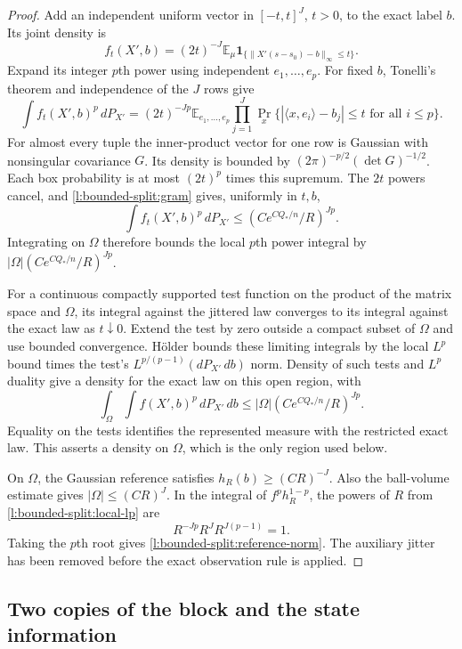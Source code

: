 \begin{proof}
Add an independent uniform vector in \([-t,t]^J\), \(t>0\), to
the exact label \(b\).  Its joint density is
\[
 f_t(X',b)=(2t)^{-J}\mathbb E_\mu
   \mathbf1_{\{\|X'(s-s_0)-b\|_\infty\le t\}}.
\]
Expand its integer \(p\)th power using independent
\(e_1,\ldots,e_p\).  For fixed \(b\), Tonelli's theorem and
independence of the \(J\) rows give
\[
 \int f_t(X',b)^p\,dP_{X'}
 =(2t)^{-Jp}\mathbb E_{e_1,\ldots,e_p}
 \prod_{j=1}^J
 \Pr_x\{|\langle x,e_i\rangle-b_j|\le t\text{ for all }i\le p\}.
\]
For almost every tuple the inner-product vector for one row is
Gaussian with nonsingular covariance \(G\).  Its density is bounded
by \((2\pi)^{-p/2}(\det G)^{-1/2}\).  Each box probability is
at most \((2t)^p\) times this supremum.  The \(2t\) powers cancel,
and \eqref{l:bounded-split:gram} gives, uniformly in \(t,b\),
\[
 \int f_t(X',b)^p\,dP_{X'}
 \le(Ce^{CQ_*/n}/R)^{Jp}.
\]
Integrating on \(\Omega\) therefore bounds the local \(p\)th
power integral by
\(|\Omega|(Ce^{CQ_*/n}/R)^{Jp}\).

For a continuous compactly supported test function on the product
of the matrix space and \(\Omega\), its integral against the
jittered law converges to its integral against the exact law as
\(t\downarrow0\).  Extend the test by zero outside a compact
subset of \(\Omega\) and use bounded convergence.
H\"older bounds these limiting integrals by the local \(L^p\)
bound times the test's \(L^{p/(p-1)}(dP_{X'}\,db)\) norm.
Density of such tests and \(L^p\) duality give a density for the
exact law on this open region, with
\begin{equation}\label{l:bounded-split:local-lp}
 \int_\Omega\int f(X',b)^p\,dP_{X'}\,db
 \le|\Omega|(Ce^{CQ_*/n}/R)^{Jp}.
\end{equation}
Equality on the tests identifies the represented measure with the
restricted exact law.  This asserts a density on \(\Omega\), which
is the only region used below.

On \(\Omega\), the Gaussian reference satisfies
\(h_R(b)\ge(CR)^{-J}\).  Also the ball-volume estimate gives
\(|\Omega|\le(CR)^J\).  In the integral of \(f^ph_R^{1-p}\),
the powers of \(R\) from \eqref{l:bounded-split:local-lp} are
\[
 R^{-Jp}R^JR^{J(p-1)}=1.
\]
Taking the \(p\)th root gives
\eqref{l:bounded-split:reference-norm}.  The auxiliary jitter has
been removed before the exact observation rule is applied.
\end{proof}

\subsection{Two copies of the block and the state information}

